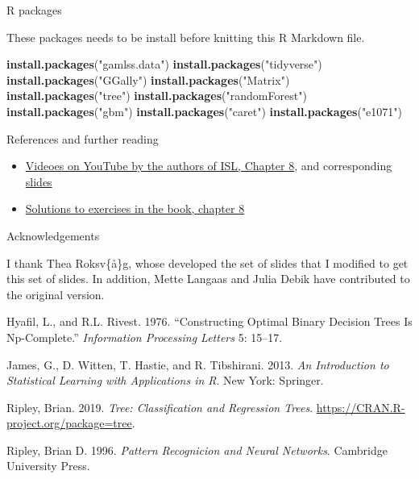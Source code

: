 \documentclass[10pt,ignorenonframetext,]{beamer}
\newenvironment{Shaded}{\begin{snugshade}}{\end{snugshade}}
\newcommand{\KeywordTok}[1]{\textcolor[rgb]{0.13,0.29,0.53}{\textbf{#1}}}
\newcommand{\StringTok}[1]{\textcolor[rgb]{0.31,0.60,0.02}{#1}}
\newcommand{\NormalTok}[1]{#1}
\providecommand{\tightlist}{%
  \setlength{\itemsep}{0pt}\setlength{\parskip}{0pt}}
\begin{document}
\begin{frame}[fragile]{R packages}

These packages needs to be install before knitting this R Markdown file.

\begin{Shaded}
\begin{Highlighting}[]
\KeywordTok{install.packages}\NormalTok{(}\StringTok{"gamlss.data"}\NormalTok{)}
\KeywordTok{install.packages}\NormalTok{(}\StringTok{"tidyverse"}\NormalTok{)}
\KeywordTok{install.packages}\NormalTok{(}\StringTok{"GGally"}\NormalTok{)}
\KeywordTok{install.packages}\NormalTok{(}\StringTok{"Matrix"}\NormalTok{)}
\KeywordTok{install.packages}\NormalTok{(}\StringTok{"tree"}\NormalTok{)}
\KeywordTok{install.packages}\NormalTok{(}\StringTok{"randomForest"}\NormalTok{)}
\KeywordTok{install.packages}\NormalTok{(}\StringTok{"gbm"}\NormalTok{)}
\KeywordTok{install.packages}\NormalTok{(}\StringTok{"caret"}\NormalTok{)}
\KeywordTok{install.packages}\NormalTok{(}\StringTok{"e1071"}\NormalTok{)}
\end{Highlighting}
\end{Shaded}

\end{frame}

\begin{frame}{References and further reading}

\begin{itemize}
\tightlist
\item
  \href{https://www.youtube.com/playlist?list=PL5-da3qGB5IB23TLuA8ZgVGC8hV8ZAdGh}{Videoes
  on YouTube by the authors of ISL, Chapter 8}, and corresponding
  \href{https://lagunita.stanford.edu/c4x/HumanitiesScience/StatLearning/asset/trees.pdf}{slides}
\item
  \href{https://rstudio-pubs-static.s3.amazonaws.com/65564_925dfde884e14ef9b5735eddd16c263e.html}{Solutions
  to exercises in the book, chapter 8}
\end{itemize}

\end{frame}

\begin{frame}{Acknowledgements}

I thank Thea Roksv\{\aa\}g, whose developed the set of slides that I
modified to get this set of slides. In addition, Mette Langaas and Julia
Debik have contributed to the original version.

\hypertarget{refs}{}
\hypertarget{ref-hyafilrivest1976}{}
Hyafil, L., and R.L. Rivest. 1976. ``Constructing Optimal Binary
Decision Trees Is Np-Complete.'' \emph{Information Processing Letters}
5: 15--17.

\hypertarget{ref-james.etal}{}
James, G., D. Witten, T. Hastie, and R. Tibshirani. 2013. \emph{An
Introduction to Statistical Learning with Applications in R}. New York:
Springer.

\hypertarget{ref-tree2019}{}
Ripley, Brian. 2019. \emph{Tree: Classification and Regression Trees}.
\url{https://CRAN.R-project.org/package=tree}.

\hypertarget{ref-Ripley}{}
Ripley, Brian D. 1996. \emph{Pattern Recognicion and Neural Networks}.
Cambridge University Press.

\end{frame}
\end{document}

